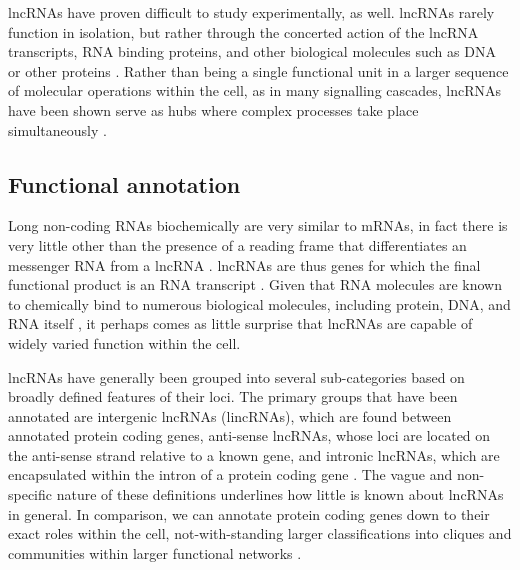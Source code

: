 lncRNAs have proven difficult to study experimentally, as well. lncRNAs rarely function in isolation, but rather through the concerted action of the lncRNA transcripts, RNA binding proteins, and other biological molecules such as DNA or other proteins \cite{Chu2015SystematicProteins,Schertzer2019LncRNA-InducedDNA,Hacisuleyman2016FunctionLocus,Wang2011AExpression,Yang2013MALAT-1Regulation}. Rather than being a single functional unit in a larger sequence of molecular operations within the cell, as in many signalling cascades, lncRNAs have been shown serve as hubs where complex processes take place simultaneously \cite{Schertzer2019LncRNA-InducedDNA, Chu2015SystematicProteins, Moindrot2015ASilencing,Brockdorff2018LocalNcRNA}. 



\subsection{Functional annotation}
Long non-coding RNAs biochemically are very similar to mRNAs, in fact there is very little other than the presence of a reading frame that differentiates an messenger RNA from a lncRNA \cite{Amaral2008TheMachine}. lncRNAs are thus genes for which the final functional product is an RNA transcript \cite{Ponting2009EvolutionRNAs}. Given that RNA molecules are known to chemically bind to numerous biological molecules, including protein, DNA, and RNA itself \cite{Chu2015SystematicProteins,Hacisuleyman2016FunctionLocus,Schertzer2019LncRNA-InducedDNA}, it perhaps comes as little surprise that lncRNAs are capable of widely varied function within the cell. 

lncRNAs have generally been grouped into several sub-categories based on broadly defined features of their loci. The primary groups that have been annotated are intergenic lncRNAs (lincRNAs), which are found between annotated protein coding genes, anti-sense lncRNAs, whose loci are located on the anti-sense strand relative to a known gene, and intronic lncRNAs, which are encapsulated within the intron of a protein coding gene \cite{Rinn2012GenomeRNAs}. The vague and non-specific nature of these definitions underlines how little is known about lncRNAs in general. In comparison, we can annotate protein coding genes down to their exact roles within the cell, not-with-standing larger classifications into cliques and communities within larger functional networks \cite{Loewenstein2009ProteinInference.}. 

